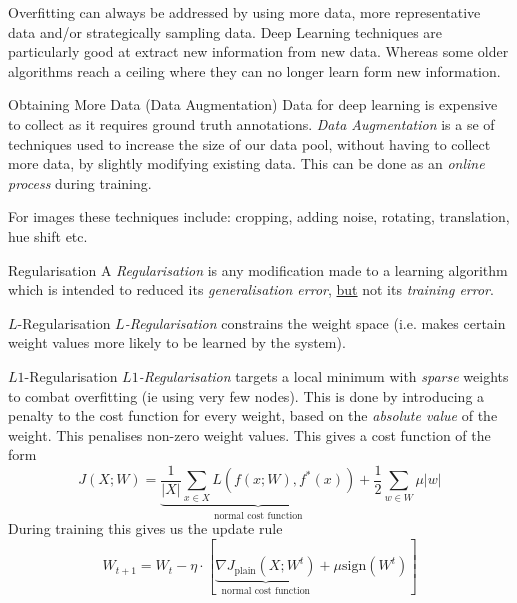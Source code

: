 \documentclass[11pt,a4paper]{article}
\begin{document}
  \begin{remark}{Overfitting can always be addressed by using more data, more representative data and/or strategically sampling data.}
    Deep Learning techniques are particularly good at extract new information from new data. Whereas some older algorithms reach a ceiling where they can no longer learn form new information.
  \end{remark}

  \begin{proposition}{Obtaining More Data (Data Augmentation)}
    Data for deep learning is expensive to collect as it requires ground truth annotations. \textit{Data Augmentation} is a se of techniques used to increase the size of our data pool, without having to collect more data, by slightly modifying existing data. This can be done as an \textit{online process} during training.
    \par For images these techniques include: cropping, adding noise, rotating, translation, hue shift etc.
  \end{proposition}

  \begin{definition}{Regularisation}
    A \textit{Regularisation} is any modification made to a learning algorithm which is intended to reduced its \textit{generalisation error}, \underline{but} not its \textit{training error}.
  \end{definition}

  \begin{definition}{$L$-Regularisation}
    \textit{$L$-Regularisation} constrains the weight space (i.e. makes certain weight values more likely to be learned by the system).
  \end{definition}

  \begin{definition}{$L1$-Regularisation}
    \textit{$L1$-Regularisation} targets a local minimum with \textit{sparse} weights to combat overfitting (ie using very few nodes). This is done by introducing a penalty to the cost function for every weight, based on the \textit{absolute value} of the weight. This penalises non-zero weight values. This gives a cost function of the form
    \[ J(X;W)=\underbrace{\frac1{|X|}\sum_{x\in X}L(f(x;W),f^*(x))}_\text{normal cost function}+\frac12\sum_{w\in W}\mu|w| \]
    During training this gives us the update rule
    \[ W_{t+1}=W_t-\eta\cdot\left[\underbrace{\nabla J_\text{plain}(X;W^t)}_\text{normal cost function}+\mu\text{sign}(W^t)\right] \]
  \end{definition}
\end{document}
